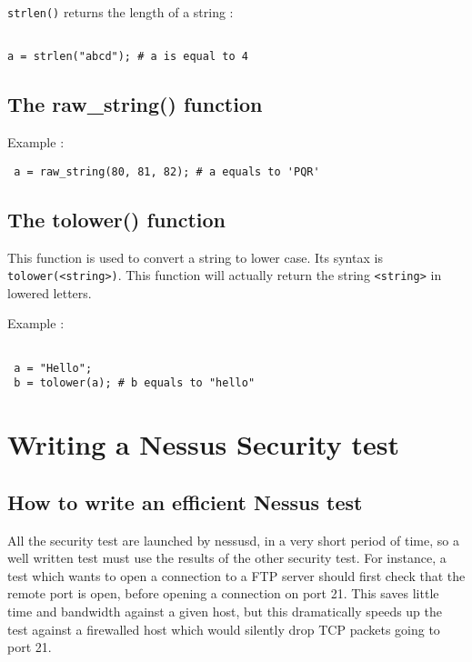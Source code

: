 \documentclass{article}
\begin{document}
\verb+strlen()+ returns the length of a string :
\begin{verbatim}

a = strlen("abcd"); # a is equal to 4 

\end{verbatim}

\subsection{The raw\_string() function}

Example : 
\begin{verbatim}
 a = raw_string(80, 81, 82); # a equals to 'PQR'
\end{verbatim}

\subsection{The tolower() function}
 
 This function is used to convert a string to lower case. Its syntax is
 \verb+tolower(<string>)+. This function will actually return the string
 \verb+<string>+ in lowered letters.
 
Example :

\begin{verbatim}

 a = "Hello";
 b = tolower(a); # b equals to "hello"

\end{verbatim}

 
\newpage
\section{Writing a Nessus Security test}

\subsection{How to write an efficient Nessus test}

All the security test are launched by nessusd, in a very short
period of time, so a well written test must use the results of the
other security test. For instance, a test which wants to open
a connection to a FTP server should first check that the 
remote port is open, before opening a connection on port 21. 
This saves little time and bandwidth against a given host,
but this dramatically speeds up the test against a firewalled host
which would silently drop TCP packets going to port 21.
\end{document}
